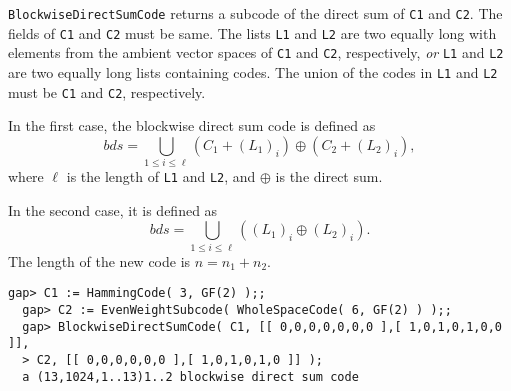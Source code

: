 \documentclass[11pt]{report}
\begin{document}
{{{ \texttt{BlockwiseDirectSumCode} returns a subcode of the direct sum of \mbox{\texttt{C1}} and \mbox{\texttt{C2}}. The fields of \mbox{\texttt{C1}} and \mbox{\texttt{C2}} must be same. The lists \mbox{\texttt{L1}} and \mbox{\texttt{L2}} are two equally long with elements from the ambient vector spaces of \mbox{\texttt{C1}} and \mbox{\texttt{C2}}, respectively, \emph{or} \mbox{\texttt{L1}} and \mbox{\texttt{L2}} are two equally long lists containing codes. The union of the codes in \mbox{\texttt{L1}} and \mbox{\texttt{L2}} must be \mbox{\texttt{C1}} and \mbox{\texttt{C2}}, respectively. 

 In the first case, the blockwise direct sum code is defined as 
\[ bds = \bigcup_{1 \leq i \leq \ell} ( C_1 + (L_1)_i ) \oplus ( C_2 + (L_2)_i ), \]
 where $\ell$ is the length of \mbox{\texttt{L1}} and \mbox{\texttt{L2}}, and $\oplus$ is the direct sum. 

 In the second case, it is defined as 
\[ bds = \bigcup_{1 \leq i \leq \ell} ( (L_1)_i \oplus (L_2)_i ). \]
 The length of the new code is $n = n_1 + n_2$. }

 
\begin{Verbatim}[fontsize=\small,frame=single,label=Example]
  gap> C1 := HammingCode( 3, GF(2) );;
  gap> C2 := EvenWeightSubcode( WholeSpaceCode( 6, GF(2) ) );;
  gap> BlockwiseDirectSumCode( C1, [[ 0,0,0,0,0,0,0 ],[ 1,0,1,0,1,0,0 ]],
  > C2, [[ 0,0,0,0,0,0 ],[ 1,0,1,0,1,0 ]] );
  a (13,1024,1..13)1..2 blockwise direct sum code
\end{Verbatim}
 }

 }

 
\end{document}
